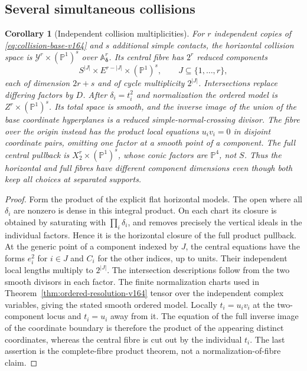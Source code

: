 \documentclass[11pt,reqno]{amsart}
\numberwithin{equation}{section}
\newtheorem{corollary}[theorem]{Corollary}
\theoremstyle{definition}\newtheorem{definition}[theorem]{Definition}
\theoremstyle{remark}\newtheorem{remark}[theorem]{Remark}
\newcommand{\Pj}{\mathbb P}\newcommand{\A}{\mathbb A}
\begin{document}
\subsection{Several simultaneous collisions}
\begin{corollary}[Independent collision multiplicities]
\label{cor:multiple-collisions-v164}
For $r$ independent copies of \eqref{eq:collision-base-v164} and
$s$ additional simple contacts, the horizontal collision space is
$\mathcal Y^r\times(\Pj^1)^s$ over $\mathbb A^r_{\boldsymbol\delta}$.
Its central fibre has $2^r$ reduced components
\[
 S^{|J|}\times E^{r-|J|}\times(\Pj^1)^s,
                   \qquad J\subseteq\{1,\ldots,r\},
\]
each of dimension $2r+s$ and of cycle multiplicity $2^{|J|}$.
Intersections replace differing factors by $D$.
After $\delta_i=t_i^2$ and normalization the ordered model is
$Z^r\times(\Pj^1)^s$. Its total space is smooth, and the inverse
image of the union of the base coordinate hyperplanes is a reduced
simple-normal-crossing divisor. The fibre over the origin instead
has the product local equations $u_iv_i=0$ in disjoint coordinate
pairs, omitting one factor at a smooth point of a component.
The full central pullback is $X_2^r\times(\Pj^1)^s$, whose conic
factors are $\Pj^4$, not $S$. Thus the horizontal and full fibres
have different component dimensions even though both keep all
choices at separated supports.
\end{corollary}
\begin{proof}
Form the product of the explicit flat horizontal models. The
open where all $\delta_i$ are nonzero is dense in this integral
product. On each chart its closure is obtained by saturating with
$\prod_i\delta_i$, and removes precisely the vertical ideals in
the individual factors. Hence it is the horizontal closure of the
full product pullback. At the generic point of a component indexed
by $J$, the central equations have the forms $e_i^2$ for $i\in J$
and $C_i$ for the other indices, up to units. Their independent
local lengths multiply to $2^{|J|}$. The intersection descriptions
follow from the two smooth divisors in each factor. The finite
normalization charts used in Theorem~\ref{thm:ordered-resolution-v164}
tensor over the independent complex variables, giving the stated
smooth ordered model. Locally $t_i=u_iv_i$ at the two-component
locus and $t_i=u_i$ away from it. The equation of the full inverse
image of the coordinate boundary is therefore the product of the
appearing distinct coordinates, whereas the central fibre is cut
out by the individual $t_i$. The last assertion is the complete-fibre
product theorem, not a normalization-of-fibre claim.
\end{proof}
\end{document}
